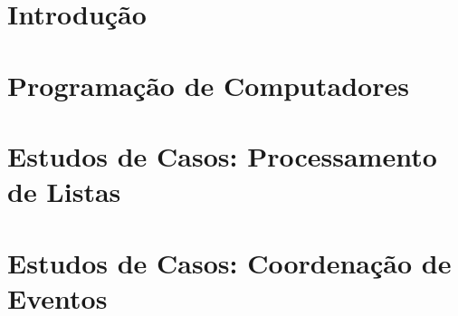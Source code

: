 \documentclass[relatorio]{tex/unemat-comp}
\begin{document}
\chapter*{Introdução}\label{chap:intro}


\chapter{Programação de Computadores}\label{chap:prog}


\chapter{Estudos de Casos: Processamento de Listas}\label{chap:processamentoDeListas}


\chapter{Estudos de Casos: Coordenação de Eventos}\label{chap:coordenacaoDeEventos}






\cleardoublepage


\arial
\printbibliography[heading=bibintoc,title=\refname]


\end{document}
